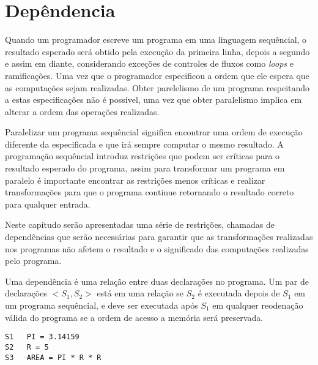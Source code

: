 
\chapter{Depêndencia}

Quando um programador escreve um programa em uma linguagem sequêncial, o
resultado esperado será obtido pela execução da primeira linha, depois a segundo
e assim em diante, considerando exceções de controles de fluxos como
\textit{loops} e ramificações. 
Uma vez que o programador especificou a ordem que ele espera que as computações 
sejam realizadas. 
Obter parelelismo de um programa respeitando a estas especificações não é
possível, uma vez que obter paralelismo implica em alterar a ordem das
operações realizadas.

Paralelizar um programa sequêncial significa encontrar uma ordem de execução
diferente da especificada e que irá sempre computar o mesmo resultado.
A programação sequêncial introduz restrições que podem ser críticas para o
resultado esperado do programa, assim para transformar um programa em paralelo é
importante encontrar as restrições menos críticas e realizar transformações para
que o programa continue retornando o resultado correto para qualquer entrada.

Neste capítudo serão apresentadas uma série de restrições, chamadas de
dependências que serão necessárias para garantir que as transformações
realizadas nos programas não afetem o resultado e o significado das computações
realizadas pelo programa.

Uma dependência é uma relação entre duas declarações no programa. Um par de
declarações $<S_1,S_2>$ está em uma relação se $S_2$ é executada depois de $S_1$
em um programa sequêncial, e deve ser executada após $S_1$ em qualquer
reodenação válida do programa se a ordem de acesso a memória será preservada.

\begin{verbatim}
S1   PI = 3.14159
S2   R = 5 
S3   AREA = PI * R * R
\end{verbatim}



